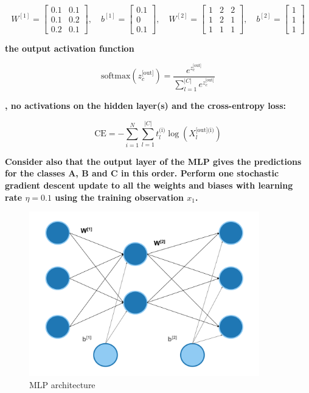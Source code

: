 \documentclass[12pt]{article}
\begin{document}
\begin{enumerate}
    \[
W^{[1]} = \begin{bmatrix}
0.1 & 0.1 \\
0.1 & 0.2 \\
0.2 & 0.1
\end{bmatrix}, \quad
b^{[1]} = \begin{bmatrix}
0.1 \\
0 \\
0.1
\end{bmatrix}, \quad
W^{[2]} = \begin{bmatrix}
1 & 2 & 2 \\
1 & 2 & 1 \\
1 & 1 & 1
\end{bmatrix}, \quad
b^{[2]} = \begin{bmatrix}
1 \\
1 \\
1
\end{bmatrix}
\]

\textbf{the output activation function}

\begin{equation*}
    \text{softmax}(z_c^\text{[out]}) = \frac{e^{z_c^\text{[out]}}}{\sum_{l=1}^{|C|} e^{z_c^\text{[out]}}}
\end{equation*}

\textbf{, no activations on the hidden layer(s) and the cross-entropy loss:}

\begin{equation}\label{eq:CE}
    \text{CE} = -\sum_{i=1}^{N}\sum_{l=1}^{|C|} t_{l}^{\text{(i)}} \log(X_{l}^{\text{[out](i)}})
\end{equation}

\textbf{Consider also that the output layer of the MLP gives the predictions for the classes A, B and C in this order. Perform one
stochastic gradient descent update to all the weights and biases with learning rate $\eta = 0.1$
using the training observation $x_1$.}

\begin{figure}[H]
    \centering
    \includegraphics[width=10cm]{./Part I/MLP.pdf}
    \caption{MLP architecture}
\end{figure}


\end{enumerate}
\end{document}
